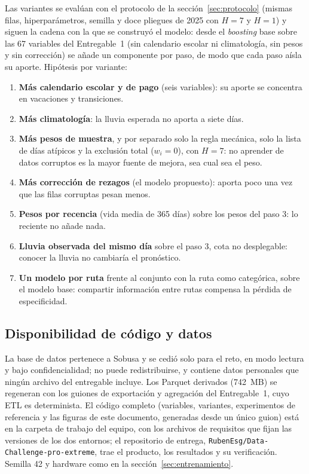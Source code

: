 Las variantes se evalúan con el protocolo de la sección~\ref{sec:protocolo} (mismas filas, hiperparámetros,
semilla y doce pliegues de 2025 con $H = 7$ y $H = 1$) y siguen la cadena con la que se construyó el modelo:
desde el \emph{boosting} base sobre las 67 variables del Entregable~1 (sin calendario escolar ni
climatología, sin pesos y sin corrección) se añade un componente por paso, de modo que cada paso aísla su
aporte. Hipótesis por variante:
\begin{enumerate}
  \item \textbf{Más calendario escolar y de pago} (seis variables): su aporte se concentra en vacaciones y
        transiciones.
  \item \textbf{Más climatología}: la lluvia esperada no aporta a siete días.
  \item \textbf{Más pesos de muestra}, y por separado solo la regla mecánica, solo la lista de días
        atípicos y la exclusión total ($w_i = 0$), con $H = 7$: no aprender de datos corruptos es la mayor
        fuente de mejora, sea cual sea el peso.
  \item \textbf{Más corrección de rezagos} (el modelo propuesto): aporta poco una vez que las filas
        corruptas pesan menos.
  \item \textbf{Pesos por recencia} (vida media de 365 días) sobre los pesos del paso 3: lo reciente no
        añade nada.
  \item \textbf{Lluvia observada del mismo día} sobre el paso 3, cota no desplegable: conocer la lluvia no
        cambiaría el pronóstico.
  \item \textbf{Un modelo por ruta} frente al conjunto con la ruta como categórica, sobre el modelo base:
        compartir información entre rutas compensa la pérdida de especificidad.
\end{enumerate}



\subsection{Disponibilidad de código y datos}
\label{sec:disponibilidad}

La base de datos pertenece a Sobusa y se cedió solo para el reto, en modo lectura y bajo confidencialidad;
no puede redistribuirse, y contiene datos personales que ningún archivo del entregable incluye. Los Parquet
derivados (742~MB) se regeneran con los guiones de exportación y agregación del Entregable~1, cuyo ETL es
determinista. El código completo (variables, variantes, experimentos de referencia y las figuras de este
documento, generadas desde un único guion) está en la carpeta de trabajo del equipo, con los archivos de
requisitos que fijan las versiones de los dos entornos; el repositorio de entrega,
\texttt{RubenEsg/Data-Challenge-pro-extreme}, trae el producto, los resultados y su verificación.
Semilla 42 y hardware como en la sección~\ref{sec:entrenamiento}.
